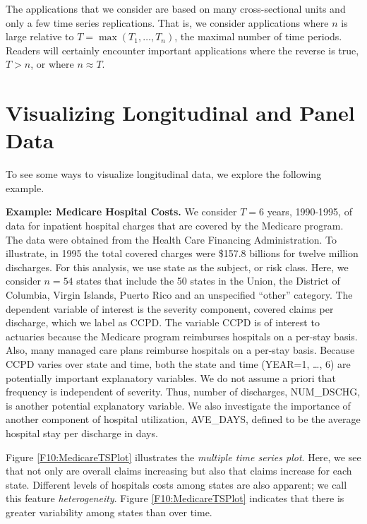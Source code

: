 The applications that we consider are based on many cross-sectional
units and only a few time series replications. That is, we consider
applications where $n$ is large relative to $T = \max (T_1, \ldots,
T_n)$, the maximal number of time periods. Readers will certainly
encounter important applications where the reverse is true, $T > n$,
or where $n \approx T$.


\section{Visualizing Longitudinal and Panel Data}\label{S10:Visual}

To see some ways to visualize longitudinal data, we explore the
following example.

\bigskip


\linejed{}

\textbf{Example: Medicare Hospital Costs.}  We consider $T=6$ years, 1990-1995, of data for
inpatient hospital charges that are covered by the Medicare program.
The data were obtained from the Health Care Financing
Administration. To illustrate, in 1995 the total covered charges
were \$157.8 billions for twelve million discharges. For this
analysis, we use state as the subject, or risk class. Here, we
consider $n=54$ states that include the 50 states in the Union, the
District of Columbia, Virgin Islands, Puerto Rico and an unspecified
``other'' category. The dependent variable of interest is the
severity component, covered claims per discharge, which we label as
CCPD. The variable CCPD is of interest to actuaries because the
Medicare program reimburses hospitals on a per-stay basis. Also,
many managed care plans reimburse hospitals on a per-stay basis.
Because CCPD varies over state and time, both the state and time
(YEAR=1, \ldots, 6) are potentially important explanatory variables.
We do not assume a priori that frequency is independent of severity.
Thus, number of discharges, NUM\_DSCHG, is another potential
explanatory variable. We also investigate the importance of another
component of hospital utilization, AVE\_DAYS, defined to be the
average hospital stay per discharge in days.



Figure \ref{F10:MedicareTSPlot} illustrates the \textit{multiple
time series plot}. Here, we see that not only are overall claims
increasing but also that claims increase for each state. Different
levels of hospitals costs among states are also apparent; we call
this feature \emph{heterogeneity}. Figure \ref{F10:MedicareTSPlot}
indicates that there is greater variability among states than over
time.


